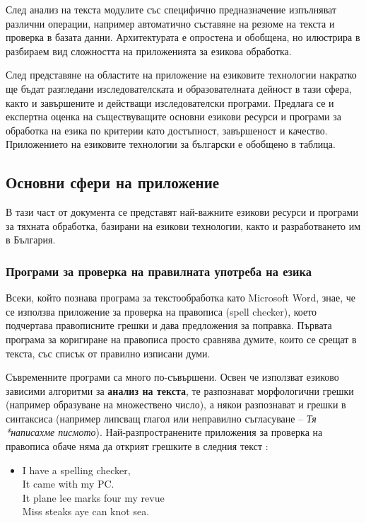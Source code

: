 \begin{multicols}{2}
  След анализ на текста модулите със специфично предназначение изпълняват различни операции, например автоматично съставяне на резюме на текста и проверка в базата данни. Архитектурата е опростена и обобщена, но илюстрира в разбираем вид сложността на приложенията за езикова обработка. 

  След представяне на областите на приложение на езиковите технологии накратко ще бъдат разгледани изследователската и образователната дейност в тази сфера, както и завършените и действащи изследователски програми. Предлага се  и експертна оценка на съществуващите основни езикови ресурси и програми за обработка на езика по критерии като достъпност, завършеност и качество. Приложението на езиковите технологии за български е обобщено в таблица.

  \subsection{Основни сфери на приложение}

  В тази част от документа се представят най-важните езикови ресурси и програми за тяхната обработка, базирани на езикови технологии, както и разработването им в България. 

  \subsubsection{Програми за проверка на правилната употреба на езика}

  Всеки, който познава програма за текстообработка като Microsoft Word, знае, че се използва приложение за проверка на правописа (spell checker), което подчертава правописните грешки и дава предложения за поправка. Първата програма за коригиране на правописа просто сравнява думите, които се срещат в текста, със списък от правилно изписани думи. 

  Съвременните програми са много по-съвършени. Освен че използват
  езиково зависими алгоритми за \textbf{анализ на текста}, те разпознават
  морфологични грешки (например образуване на множествено число), а
  някои разпознават и грешки в синтаксиса (например липсващ глагол или
  неправилно съгласуване -- {\it Тя *написахме
    писмото}). Най-разпространените приложения за проверка на правописа
  обаче няма да открият грешките в следния текст \cite{zar1}: 

  \begin{itemize}
  \item[] I have a spelling checker,\\
    It came with my PC.\\
    It plane lee marks four my revue\\
    Miss steaks aye can knot sea.
  \end{itemize}


\end{multicols}
